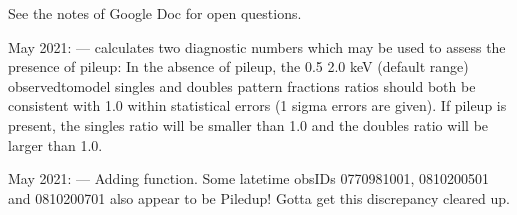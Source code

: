 \documentclass[letterpaper,10pt,english]{sphinxmanual}
\begin{document}
\sphinxAtStartPar
See the notes of Google Doc for open questions.

 May 2021:
—
 calculates two diagnostic numbers which may be used to assess
the presence of pile\sphinxhyphen{}up: In the absence of pile\sphinxhyphen{}up, the 0.5 \sphinxhyphen{} 2.0 keV (default range)
observed\sphinxhyphen{}to\sphinxhyphen{}model singles and doubles pattern fractions ratios should both be
consistent with 1.0 within statistical errors (1 sigma errors are given).
If pile\sphinxhyphen{}up is present, the singles ratio will be smaller than 1.0 and the
doubles ratio will be larger than 1.0.

 May 2021:
—
Adding  function.
Some late\sphinxhyphen{}time obsIDs 0770981001, 0810200501 and 0810200701 also appear to be Piled\sphinxhyphen{}up!
Gotta get this discrepancy cleared up.
\end{document}
